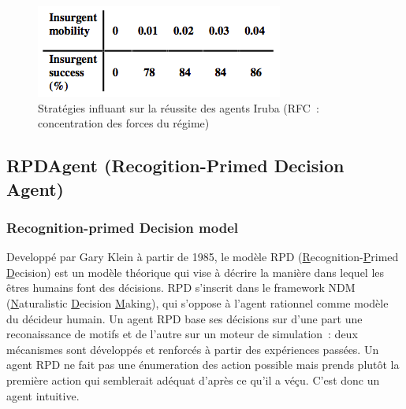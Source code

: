 \documentclass{article}
\begin{document}
\begin{center}
\begin{figure}[H]
\begin{minipage}[H]{0.4\linewidth}
\end{minipage}
\hfill
\begin{minipage}[H]{0.4\linewidth}
	\centering
	\includegraphics[width=\linewidth]{../ressources/iruba_mobility}
\end{minipage}
\caption{Stratégies influant sur la réussite des agents Iruba (RFC~: concentration des forces du régime)}
\end{figure}
\end{center}

\subsection{RPDAgent (Recogition-Primed Decision Agent)}
\subsubsection{Recognition-primed Decision model}
Developpé par Gary Klein à partir de 1985, le modèle RPD (\underline{R}ecognition-\underline{P}rimed \underline{D}ecision) est un modèle théorique qui vise à décrire la manière dans lequel les êtres humains font des décisions. RPD s'inscrit dans le framework NDM (\underline{N}aturalistic \underline{D}ecision \underline{M}aking), qui s'oppose à l'agent rationnel comme modèle du décideur humain.
Un agent RPD base ses décisions sur d'une part une reconaissance de motifs et de l'autre sur un moteur de simulation~: deux mécanismes sont développés et renforcés à partir des expériences passées. Un agent RPD ne fait pas une énumeration des action possible mais prends plutôt la première action qui semblerait adéquat d'après ce qu'il a véçu. C'est donc un agent \og{}intuitive\fg{}.
\end{document}
